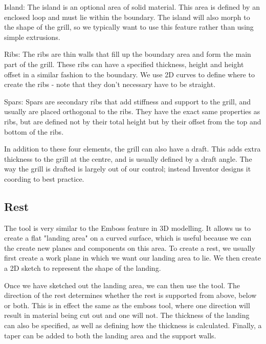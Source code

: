 Island:
The island is an optional area of solid material. This area is defined by an enclosed loop and must lie within the boundary. The island will also morph to the shape of the grill, so we typically want to use this feature rather than using simple extrusions.

Ribs:
The ribs are thin walls that fill up the boundary area and form the main part of the grill. These ribs can have a specified thickness, height and height offset in a similar fashion to the boundary. We use 2D curves to define where to create the ribs - note that they don't necessary have to be straight.

Spars:
Spars are secondary ribs that add stiffness and support to the grill, and usually are placed orthogonal to the ribs. They have the exact same properties as ribs, but are defined not by their total height but by their offset from the top and bottom of the ribs.

In addition to these four elements, the grill can also have a draft. This adds extra thickness to the grill at the centre, and is usually defined by a draft angle. The way the grill is drafted is largely out of our control; instead Inventor designs it coording to best practice. 

\subsection{Rest}



The  tool is very similar to the Emboss feature in 3D modelling. It allows us to create a flat "landing area" on a curved surface, which is useful because we can the create new planes and components on this area. To create a rest, we usually first create a work plane in which we want our landing area to lie. We then create a 2D sketch to represent the shape of the landing. 

Once we have sketched out the landing area, we can then use the  tool. The direction of the rest determines whether the rest is supported from above, below or both. This is in effect the same as the emboss tool, where one direction will result in material being cut out and one will not. The thickness of the landing can also be specified, as well as defining how the thickness is calculated. Finally, a taper can be added to both the landing area and the support walls.

